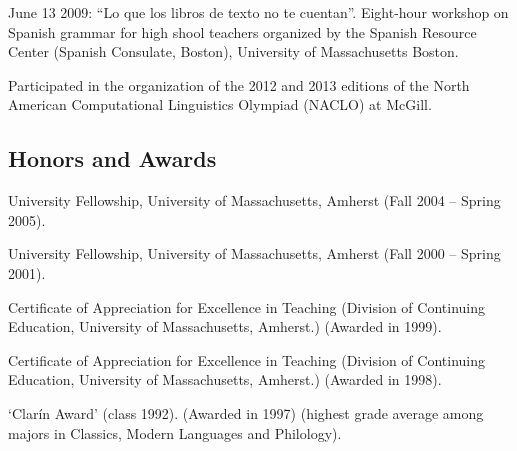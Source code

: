 \documentclass[11pt]{article}
\begin{document}
June 13 2009: ``Lo que los libros de texto no te cuentan''. Eight-hour
workshop  on Spanish grammar for high shool teachers organized by the
Spanish Resource Center (Spanish Consulate, Boston), University of
Massachusetts Boston.

Participated in the organization of the 2012 and 2013 editions of the North
American Computational Linguistics Olympiad (NACLO) at McGill.


\subsection*{Honors and Awards} 

University Fellowship, University of Massachusetts, Amherst (Fall
 2004 -- Spring 2005).

University Fellowship, University of Massachusetts, Amherst (Fall 2000
-- Spring 2001).

Certificate of Appreciation for Excellence in Teaching (Division of
Continuing Education, University of Massachusetts, Amherst.) (Awarded
in 1999).

Certificate of Appreciation for Excellence in Teaching (Division of
Continuing Education, University of Massachusetts, Amherst.) (Awarded
in 1998).

`Clar\'in Award' (class 1992). (Awarded in 1997) (highest grade average among majors in Classics, Modern Languages and Philology).


\end{document}
